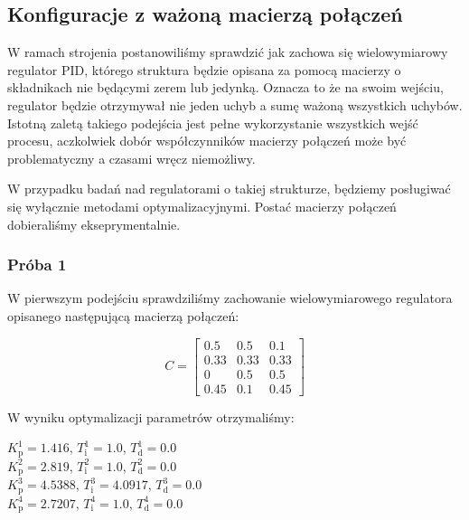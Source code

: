 \subsection{Konfiguracje z ważoną macierzą połączeń}
\label{pro_pid_konf3}

W ramach strojenia postanowiliśmy sprawdzić jak zachowa się wielowymiarowy regulator
PID, którego struktura będzie opisana za pomocą macierzy o składnikach nie będącymi
zerem lub jedynką. Oznacza to że na swoim wejściu, regulator będzie otrzymywał nie jeden uchyb
a sumę ważoną wszystkich uchybów. Istotną zaletą takiego podejścia jest pełne wykorzystanie
wszystkich wejść procesu, aczkolwiek dobór współczynników macierzy połączeń może być problematyczny
a czasami wręcz niemożliwy. 

W przypadku badań nad regulatorami o takiej strukturze, będziemy posługiwać się
wyłącznie metodami optymalizacyjnymi. Postać macierzy połączeń dobieraliśmy 
ekseprymentalnie.


\subsubsection{Próba 1}
W pierwszym podejściu sprawdziliśmy zachowanie wielowymiarowego regulatora opisanego następującą 
macierzą połączeń:

\[
C =
\begin{bmatrix}
    0.5 & 0.5 & 0.1 \\
    0.33 & 0.33 & 0.33 \\
    0 & 0.5 & 0.5 \\
    0.45 & 0.1 & 0.45 
\end{bmatrix}
\]

W wyniku optymalizacji parametrów otrzymaliśmy:

\begin{center}
    $K^{\num{1}}_{\mathrm{p}} = \num{1.416}$, $T^{\num{1}}_{\mathrm{i}} = \num{1.0}$, $T^{\num{1}}_{\mathrm{d}} = \num{0.0}$ \\
    $K^{\num{2}}_{\mathrm{p}} = \num{2.819}$, $T^{\num{2}}_{\mathrm{i}} = \num{1.0}$, $T^{\num{2}}_{\mathrm{d}} = \num{0.0}$ \\
    $K^{\num{3}}_{\mathrm{p}} = \num{4.5388}$, $T^{\num{3}}_{\mathrm{i}} = \num{4.0917}$, $T^{\num{3}}_{\mathrm{d}} = \num{0.0}$ \\
    $K^{\num{4}}_{\mathrm{p}} = \num{2.7207}$, $T^{\num{4}}_{\mathrm{i}} = \num{1.0}$, $T^{\num{4}}_{\mathrm{d}} = \num{0.0}$ \\
\end{center}

